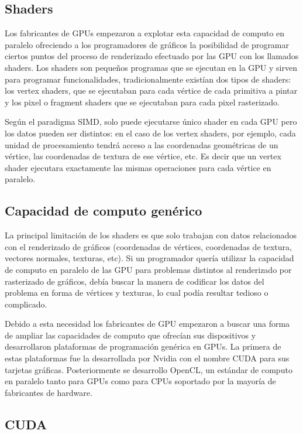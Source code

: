 \subsection{Shaders}

Los fabricantes de GPUs empezaron a explotar esta capacidad de computo en paralelo ofreciendo a los programadores de gráficos la posibilidad de programar ciertos puntos del proceso de renderizado efectuado por las GPU con los llamados shaders. Los shaders son pequeños programas que se ejecutan en la GPU y sirven para programar funcionalidades, tradicionalmente existían dos tipos de shaders: los vertex shaders, que se ejecutaban para cada vértice de cada primitiva a pintar y los pixel o fragment shaders que se ejecutaban para cada pixel rasterizado.

\medskip
Según el paradigma SIMD, solo puede ejecutarse único shader en cada GPU pero los datos pueden ser distintos: en el caso de los vertex shaders, por ejemplo, cada unidad de procesamiento tendrá acceso a las coordenadas geométricas de un vértice, las coordenadas de textura de ese vértice, etc. Es decir que un vertex shader ejecutara exactamente las mismas operaciones para cada vértice en paralelo. 

\clearpage

\subsection{Capacidad de computo genérico}
La principal limitación de los shaders es que solo trabajan con datos relacionados con el renderizado de gráficos (coordenadas de vértices, coordenadas de textura, vectores normales, texturas, etc). Si un programador quería utilizar la capacidad de computo en paralelo de las GPU para problemas distintos al renderizado por rasterizado de gráficos, debía buscar la manera de codificar los datos del problema en forma de vértices y texturas, lo cual podía resultar tedioso o complicado.

\medskip
Debido a esta necesidad los fabricantes de GPU empezaron a buscar una forma de ampliar las capacidades de computo que ofrecían sus dispositivos y desarrollaron plataformas de programación genérica en GPUs. La primera de estas plataformas fue la desarrollada por Nvidia con el nombre CUDA para sus tarjetas gráficas. Posteriormente se desarrollo OpenCL, un estándar de computo en paralelo tanto para GPUs como para CPUs soportado por la mayoría de fabricantes de hardware.

\subsection{CUDA}

